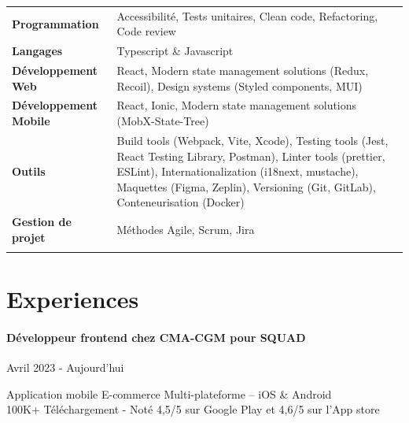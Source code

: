 \documentclass{article}
\begin{document}
\begin{tabularx}{\textwidth}{@{}lX@{}}

  \textbf{Programmation} & Accessibilité, Tests unitaires, Clean code, Refactoring, Code review \\
  \addlinespace[5pt] %

  \textbf{Langages} & Typescript \& Javascript \\
  \addlinespace[5pt] %

  \textbf{Développement Web} & React, Modern state management solutions (Redux, Recoil), Design systems (Styled components, MUI) \\
  \addlinespace[5pt] %

  \textbf{Développement Mobile} & React, Ionic, Modern state management solutions (MobX-State-Tree) \\
  \addlinespace[5pt] %

  \textbf{Outils} & Build tools (Webpack, Vite, Xcode), Testing tools (Jest, React Testing Library, Postman), Linter tools (prettier, ESLint), Internationalization (i18next, mustache), Maquettes (Figma, Zeplin), Versioning (Git, GitLab), Conteneurisation (Docker) \\
  \addlinespace[5pt] %

  \textbf{Gestion de projet} & Méthodes Agile, Scrum, Jira \\
  \addlinespace[5pt] %
  
\end{tabularx}

\vspace{4ex}
\hrulefill
\section*{Experiences}

\paragraph{Développeur frontend chez CMA-CGM pour SQUAD}\hspace*{\fill}Avril 2023 - Aujourd'hui

\noindent
Application mobile E-commerce Multi-plateforme – iOS \& Android \\
100K+ Téléchargement - Noté 4,5/5 sur Google Play et 4,6/5 sur l'App store
\end{document}

